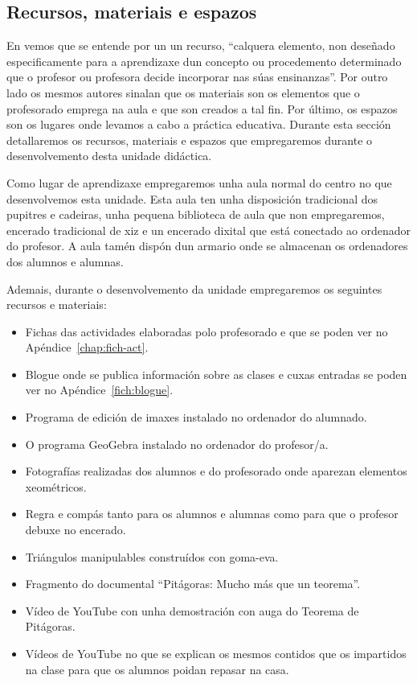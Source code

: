 \subsection{Recursos, materiais e espazos}\label{sec:recursos}

En  vemos que se entende por un un recurso, ``calquera elemento, non deseñado especificamente para a aprendizaxe dun concepto ou procedemento determinado que o profesor ou profesora decide incorporar nas súas ensinanzas''. Por outro lado os mesmos autores sinalan que os materiais son os elementos que o profesorado emprega na aula e que son creados a tal fin. Por último, os espazos son os lugares onde levamos a cabo a práctica educativa. Durante esta sección detallaremos os recursos, materiais e espazos que empregaremos durante o desenvolvemento desta unidade didáctica.

Como lugar de aprendizaxe empregaremos unha aula normal do centro no que desenvolvemos esta unidade. Esta aula ten unha disposición tradicional dos pupitres e cadeiras, unha pequena biblioteca de aula que non empregaremos, encerado tradicional de xiz e un encerado dixital que está conectado ao ordenador do profesor. A aula tamén dispón dun armario onde se almacenan os ordenadores dos alumnos e alumnas.

Ademais, durante o desenvolvemento da unidade empregaremos os seguintes recursos e materiais:

\begin{itemize}
    \item Fichas das actividades elaboradas polo profesorado e que se poden ver no Apéndice~\ref{chap:fich-act}.
    \item Blogue onde se publica información sobre as clases e cuxas entradas se poden ver no Apéndice~\ref{fich:blogue}.
    \item Programa de edición de imaxes instalado no ordenador do alumnado.
    \item O programa GeoGebra instalado no ordenador do profesor/a.
    \item Fotografías realizadas dos alumnos e do profesorado onde aparezan elementos xeométricos.
    \item Regra e compás tanto para os alumnos e alumnas como para que o profesor debuxe no encerado.
    \item Triángulos manipulables construídos con goma-eva.
    \item Fragmento do documental ``Pitágoras: Mucho más que un teorema''.
    \item Vídeo de YouTube con unha demostración con auga do Teorema de Pitágoras.
    \item Vídeos de YouTube no que se explican os mesmos contidos que os impartidos na clase para que os alumnos poidan repasar na casa.
\end{itemize}
